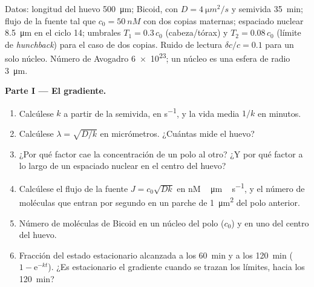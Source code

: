 \begin{problem}
\label{pb:b3:developmental-genetics:1}
Datos: longitud del huevo \qty{500}{\micro m}; Bicoid, con
$D = \qty{4}{\micro m^2/s}$ y semivida \qty{35}{min}; flujo de la
fuente tal que $c_{0} = \qty{50}{nM}$ con dos copias maternas;
espaciado nuclear \qty{8.5}{\micro m} en el ciclo 14; umbrales
$T_{1} = 0.3\,c_{0}$ (cabeza/tórax) y $T_{2} =
0.08\,c_{0}$ (límite de \emph{hunchback}) para el caso de dos copias.
Ruido de lectura $\delta c/c = 0.1$ para un solo núcleo. Número de
Avogadro \qty{6e23}{}; un núcleo es una esfera de radio
\qty{3}{\micro m}.

\medskip
\noindent\textbf{Parte I --- El gradiente.}
\begin{enumerate}
  \item Calcúlese $k$ a partir de la semivida, en \unit{s^{-1}}, y la
        vida media $1/k$ en minutos.
  \item Calcúlese $\lambda = \sqrt{D/k}$ en micrómetros. ¿Cuántas
         mide el huevo?
  \item ¿Por qué factor cae la concentración de un polo al otro? ¿Y por
        qué factor a lo largo de un espaciado nuclear en el centro del
        huevo?
  \item Calcúlese el flujo de la fuente $J = c_{0}\sqrt{Dk}$ en
        \unit{nM\,\micro m\,s^{-1}}, y el número de moléculas que entran
        por segundo en un parche de \qty{1}{\micro m^2} del polo
        anterior.
  \item Número de moléculas de Bicoid en un núcleo del polo ($c_{0}$) y
        en uno del centro del huevo.
  \item Fracción del estado estacionario alcanzada a los \qty{60}{min}
        y a los \qty{120}{min} ($1 - \mathrm{e}^{-kt}$). ¿Es
        estacionario el gradiente cuando se trazan los límites, hacia
        los \qty{120}{min}?
\end{enumerate}


\end{problem}

